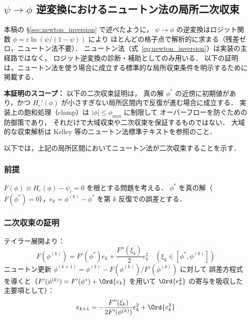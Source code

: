\subsection{\texorpdfstring{$\psi \to \phi$}{ψ→φ} 逆変換におけるニュートン法の局所二次収束}
\label{app:newton_quad_conv}

本稿の §\ref{sec:newton_inversion} で述べたように，
$\psi \to \phi$ の逆変換はロジット関数 $\phi = \varepsilon\ln(\psi/(1-\psi))$ により
ほとんどの格子点で解析的に求まる（残差ゼロ，ニュートン法不要）．
ニュートン法（式~\eqref{eq:newton_inversion}）は実装の主経路ではなく，
ロジット逆変換の診断・補助としてのみ用いる．
以下の証明は，ニュートン法を使う場合に成立する標準的な局所収束条件を明示するために掲載する．

\textbf{本証明のスコープ：} 以下の二次収束証明は，
真の解 $\phi^*$ の近傍に初期値があり，かつ
$H_\varepsilon'(\phi)$ が小さすぎない局所区間内で反復が進む場合に成立する．
実装上の飽和処理（clamp）は $|\phi| \le \phi_{\max}$ に制限して
オーバーフローを防ぐための防御策であり，
それだけで大域収束や二次収束を保証するものではない．
大域的な収束解析は Kelley \cite{Kelley2003} 等のニュートン法標準テキストを参照のこと．

以下では，上記の局所区間においてニュートン法が二次収束することを示す．

\subsubsection*{前提}

$F(\phi) \equiv H_\varepsilon(\phi) - \psi_i = 0$ を根とする問題を考える．
$\phi^*$ を真の解（$F(\phi^*)=0$），$e_k = \phi^{(k)} - \phi^*$ を第 $k$ 反復での誤差とする．

\subsubsection*{二次収束の証明}

テイラー展開より：
\[
  F(\phi^{(k)}) = F'(\phi^*) e_k + \frac{F''(\xi_k)}{2} e_k^2
  \quad (\xi_k \in [\phi^*, \phi^{(k)}])
\]
ニュートン更新 $\phi^{(k+1)} = \phi^{(k)} - F(\phi^{(k)})/F'(\phi^{(k)})$ に対して
誤差方程式を導くと（$F'(\phi^{(k)}) = F'(\phi^*) + \Ord{e_k}$ を用いて
$\Ord{e_k^2}$ の寄与を吸収した主要項として）：
\[
  e_{k+1} = -\frac{F''(\xi_k)}{2F'(\phi^{(k)})} e_k^2 + \Ord{e_k^3}
\]


